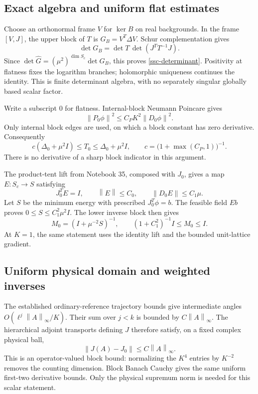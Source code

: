 \documentclass[11pt]{article}
\newcommand{\norm}[1]{\left\lVert#1\right\rVert}
\theoremstyle{remark}
\begin{document}
\subsection{Exact algebra and uniform flat estimates}

Choose an orthonormal frame \(V\) for \(\ker B\) on real backgrounds.
In the frame \([V,J]\), the upper block of \(T\) is
\(G_B=V^T\Delta V\). Schur complementation gives
\[
 \det G_B=\det T\,\det(J^TT^{-1}J).
\]
Since \(\det\widehat G=(\mu^2)^{\dim S_c}\det G_B\), this proves
\eqref{ssc-determinant}. Positivity at flatness fixes the logarithm
branches; holomorphic uniqueness continues the identity. This is
finite determinant algebra, with no separately singular globally
based scalar factor.

Write a subscript \(0\) for flatness. Internal-block Neumann Poincare
gives
\[
 \norm{P_0\phi}^2\le C_P K^2\norm{D_0\phi}^2.
\]
Only internal block edges are used, on which a block constant has
zero derivative. Consequently
\begin{equation}
 c(\Delta_0+\mu^2I)\le T_0\le\Delta_0+\mu^2I,\qquad
 c=\bigl(1+\max(C_P,1)\bigr)^{-1}.
 \label{ssc-ellipticity}
\end{equation}
There is no derivative of a sharp block indicator in this argument.

The product-tent lift from Notebook 35, composed with \(J_0\), gives
a map \(E:S_c\to S\) satisfying
\[
 J_0^TE=I,\qquad \norm E\le C_0,\qquad
 \norm{D_0E}\le C_1\mu .
\]
Let \(S\) be the minimum energy with prescribed \(J_0^T\phi=b\).
The feasible field \(Eb\) proves \(0\le S\le C_1^2\mu^2I\).
The lower inverse block then gives
\begin{equation}
 M_0=(I+\mu^{-2}S)^{-1},\qquad
 (1+C_1^2)^{-1}I\le M_0\le I .
 \label{ssc-coarse-gap}
\end{equation}
At \(K=1\), the same statement uses the identity lift and the bounded
unit-lattice gradient.

\subsection{Uniform physical domain and weighted inverses}

The established ordinary-reference trajectory bounds give
intermediate angles \(O(\ell^j\norm A_\infty/K)\). Their sum over
\(j<k\) is bounded by \(C\norm A_\infty\). The hierarchical
adjoint transports defining \(J\) therefore satisfy, on a fixed
complex physical ball,
\begin{equation}
 \norm{J(A)-J_0}\le C\norm A_\infty .
 \label{ssc-J-bound}
\end{equation}
This is an operator-valued block bound: normalizing the \(K^4\)
entries by \(K^{-2}\) removes the counting dimension. Block Banach
Cauchy gives the same uniform first-two derivative bounds.
Only the physical supremum norm is needed for this scalar statement.
\end{document}
